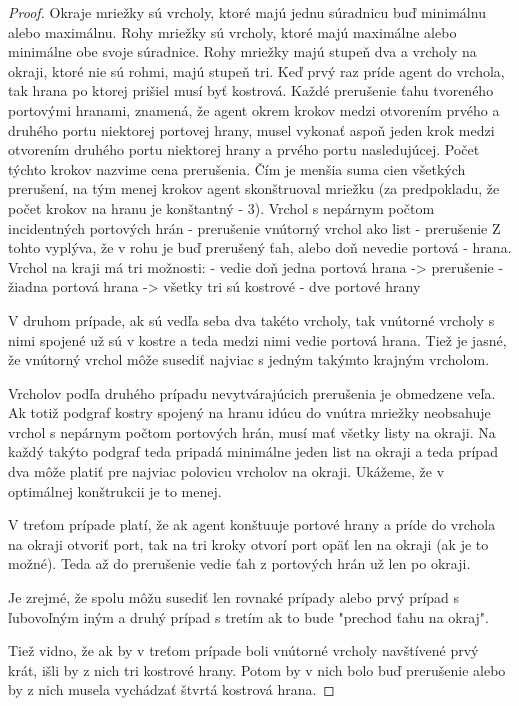 \begin{proof}
Okraje mriežky sú vrcholy, ktoré majú jednu súradnicu buď minimálnu alebo
maximálnu. Rohy mriežky sú vrcholy, ktoré majú maximálne alebo minimálne obe
svoje súradnice.
Rohy mriežky majú stupeň dva a vrcholy na okraji, ktoré nie sú rohmi, majú
stupeň tri.
Keď prvý raz príde agent do vrchola, tak hrana po ktorej prišiel musí byť
kostrová.
Každé prerušenie ťahu tvoreného portovými hranami, znamená, že agent okrem
krokov medzi otvorením prvého a druhého portu niektorej portovej hrany,
musel vykonať aspoň jeden krok medzi otvorením druhého portu niektorej hrany
a prvého portu nasledujúcej. Počet týchto krokov nazvime cena prerušenia.
Čím je menšia suma cien všetkých prerušení, na tým menej krokov agent
skonštruoval mriežku (za predpokladu, že počet krokov na hranu je konštantný
- 3).
Vrchol s nepárnym počtom incidentných portových hrán - prerušenie
vnútorný vrchol ako list - prerušenie
Z tohto vyplýva, že v rohu je buď prerušený ťah, alebo doň nevedie portová
- hrana.
Vrchol na kraji má tri možnosti:
- vedie doň jedna portová hrana -> prerušenie
- žiadna portová hrana -> všetky tri sú kostrové
- dve portové hrany

V druhom prípade, ak sú vedľa seba dva takéto vrcholy, tak vnútorné vrcholy
s nimi spojené už sú v kostre a teda medzi nimi vedie portová hrana.
Tiež je jasné, že vnútorný vrchol môže susediť najviac s jedným takýmto
krajným vrcholom.

Vrcholov podľa druhého prípadu nevytvárajúcich prerušenia je obmedzene veľa.
Ak totiž podgraf kostry spojený na hranu idúcu do vnútra mriežky neobsahuje
vrchol s nepárnym počtom portových hrán, musí mať všetky listy na okraji.
Na každý takýto podgraf teda pripadá minimálne jeden list na okraji a teda
prípad dva môže platiť pre najviac polovicu vrcholov na okraji. Ukážeme, že
v optimálnej konštrukcii je to menej.

V treťom prípade platí, že ak agent konštuuje portové hrany a príde do
vrchola na okraji otvoriť port, tak na tri kroky otvorí port opäť len na
okraji (ak je to možné). Teda až do prerušenie vedie ťah z portových hrán už
len po okraji.

Je zrejmé, že spolu môžu susediť len rovnaké prípady alebo prvý prípad s
ľubovoľným iným a druhý prípad s tretím ak to bude "prechod ťahu na okraj".

Tiež vidno, že ak by v treťom prípade boli vnútorné vrcholy navštívené prvý
krát, išli by z nich tri kostrové hrany. Potom by v nich bolo buď prerušenie
alebo by z nich musela vychádzať štvrtá kostrová hrana.


\end{proof}
